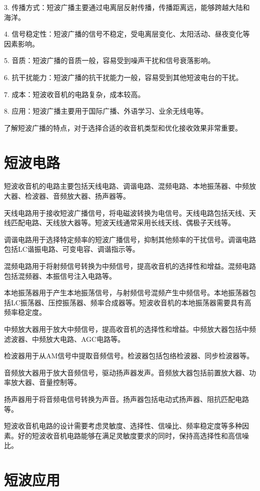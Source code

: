 \documentclass[12pt,UTF8]{ctexbook}
\begin{document}
3. 传播方式：短波广播主要通过电离层反射传播，传播距离远，能够跨越大陆和海洋。

4. 信号稳定性：短波广播的信号不稳定，受电离层变化、太阳活动、昼夜变化等因素影响。

5. 音质：短波广播的音质一般，容易受到噪声干扰和信号衰落影响。

6. 抗干扰能力：短波广播的抗干扰能力一般，容易受到其他短波电台的干扰。

7. 成本：短波收音机的电路复杂，成本较高。

8. 应用：短波广播主要用于国际广播、外语学习、业余无线电等。

了解短波广播的特点，对于选择合适的收音机类型和优化接收效果非常重要。

\section{短波电路}

短波收音机的电路主要包括天线电路、调谐电路、混频电路、本地振荡器、中频放大器、检波器、音频放大器、扬声器等。

天线电路用于接收短波广播信号，将电磁波转换为电信号。天线电路包括天线、天线匹配电路、天线放大器等。短波天线通常采用长线天线、偶极子天线等。

调谐电路用于选择特定频率的短波广播信号，抑制其他频率的干扰信号。调谐电路包括LC谐振电路、可变电容、调谐指示等。

混频电路用于将射频信号转换为中频信号，提高收音机的选择性和增益。混频电路包括混频器、本振信号注入电路等。

本地振荡器用于产生本地振荡信号，与射频信号混频产生中频信号。本地振荡器包括LC振荡器、压控振荡器、频率合成器等。短波收音机的本地振荡器需要具有高频率稳定度。

中频放大器用于放大中频信号，提高收音机的选择性和增益。中频放大器包括中频滤波器、中频放大电路、AGC电路等。

检波器用于从AM信号中提取音频信号。检波器包括包络检波器、同步检波器等。

音频放大器用于放大音频信号，驱动扬声器发声。音频放大器包括前置放大器、功率放大器、音量控制等。

扬声器用于将音频电信号转换为声音。扬声器包括电动式扬声器、阻抗匹配电路等。

短波收音机电路的设计需要考虑灵敏度、选择性、信噪比、频率稳定度等多种因素。好的短波收音机电路能够在满足灵敏度要求的同时，保持高选择性和高信噪比。

\section{短波应用}
\end{document}
